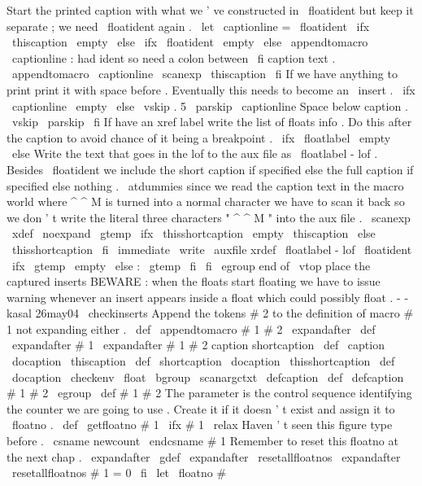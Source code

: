 {{{Start
the
printed
caption
with
what
we
'
ve
constructed
in
%
\
floatident
but
keep
it
separate
;
we
need
\
floatident
again
.
\
let
\
captionline
=
\
floatident
%
\
ifx
\
thiscaption
\
empty
\
else
\
ifx
\
floatident
\
empty
\
else
\
appendtomacro
\
captionline
{
:
}
%
had
ident
so
need
a
colon
between
\
fi
%
%
caption
text
.
\
appendtomacro
\
captionline
{
\
scanexp
\
thiscaption
}
%
\
fi
%
%
If
we
have
anything
to
print
print
it
with
space
before
.
%
Eventually
this
needs
to
become
an
\
insert
.
\
ifx
\
captionline
\
empty
\
else
\
vskip
.
5
\
parskip
\
captionline
%
%
Space
below
caption
.
\
vskip
\
parskip
\
fi
%
%
If
have
an
xref
label
write
the
list
of
floats
info
.
Do
this
%
after
the
caption
to
avoid
chance
of
it
being
a
breakpoint
.
\
ifx
\
floatlabel
\
empty
\
else
%
Write
the
text
that
goes
in
the
lof
to
the
aux
file
as
%
\
floatlabel
-
lof
.
Besides
\
floatident
we
include
the
short
%
caption
if
specified
else
the
full
caption
if
specified
else
nothing
.
{
%
\
atdummies
%
%
since
we
read
the
caption
text
in
the
macro
world
where
^
^
M
%
is
turned
into
a
normal
character
we
have
to
scan
it
back
so
%
we
don
'
t
write
the
literal
three
characters
"
^
^
M
"
into
the
aux
file
.
\
scanexp
{
%
\
xdef
\
noexpand
\
gtemp
{
%
\
ifx
\
thisshortcaption
\
empty
\
thiscaption
\
else
\
thisshortcaption
\
fi
}
%
}
%
\
immediate
\
write
\
auxfile
{
xrdef
{
\
floatlabel
-
lof
}
{
\
floatident
\
ifx
\
gtemp
\
empty
\
else
:
\
gtemp
\
fi
}
}
%
}
%
\
fi
\
egroup
%
end
of
\
vtop
%
%
place
the
captured
inserts
%
%
BEWARE
:
when
the
floats
start
floating
we
have
to
issue
warning
%
whenever
an
insert
appears
inside
a
float
which
could
possibly
%
float
.
-
-
kasal
26may04
%
\
checkinserts
}
%
Append
the
tokens
#
2
to
the
definition
of
macro
#
1
not
expanding
either
.
%
\
def
\
appendtomacro
#
1
#
2
{
%
\
expandafter
\
def
\
expandafter
#
1
\
expandafter
{
#
1
#
2
}
%
}
%
caption
shortcaption
%
\
def
\
caption
{
\
docaption
\
thiscaption
}
\
def
\
shortcaption
{
\
docaption
\
thisshortcaption
}
\
def
\
docaption
{
\
checkenv
\
float
\
bgroup
\
scanargctxt
\
defcaption
}
\
def
\
defcaption
#
1
#
2
{
\
egroup
\
def
#
1
{
#
2
}
}
%
The
parameter
is
the
control
sequence
identifying
the
counter
we
are
%
going
to
use
.
Create
it
if
it
doesn
'
t
exist
and
assign
it
to
\
floatno
.
\
def
\
getfloatno
#
1
{
%
\
ifx
#
1
\
relax
%
Haven
'
t
seen
this
figure
type
before
.
\
csname
newcount
\
endcsname
#
1
%
%
%
Remember
to
reset
this
floatno
at
the
next
chap
.
\
expandafter
\
gdef
\
expandafter
\
resetallfloatnos
\
expandafter
{
\
resetallfloatnos
#
1
=
0
}
%
\
fi
\
let
\
floatno
#
}}}
